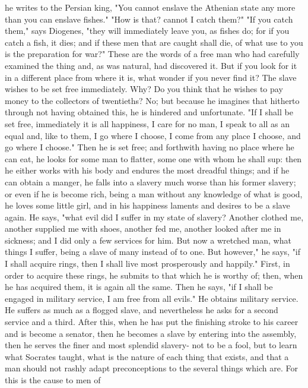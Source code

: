 \documentclass[a4paper]{article}
\begin{document}
he writes to the Persian king, "You cannot enslave the Athenian state any more
than you can enslave fishes." "How is that? cannot I catch them?" "If you catch
them," says Diogenes, "they will immediately leave you, as fishes do; for if
you catch a fish, it dies; and if these men that are caught shall die, of what
use to you is the preparation for war?" These are the words of a free man who
had carefully examined the thing and, as was natural, had discovered it. But if
you look for it in a different place from where it is, what wonder if you never
find it?
    The slave wishes to be set free immediately. Why? Do you think that he
wishes to pay money to the collectors of twentieths? No; but because he
imagines that hitherto through not having obtained this, he is hindered and
unfortunate. "If I shall be set free, immediately it is all happiness, I care
for no man, I speak to all as an equal and, like to them, I go where I choose,
I come from any place I choose, and go where I choose." Then he is set free;
and forthwith having no place where he can eat, he looks for some man to
flatter, some one with whom he shall sup: then he either works with his body
and endures the most dreadful things; and if he can obtain a manger, he falls
into a slavery much worse than his former slavery; or even if he is become
rich, being a man without any knowledge of what is good, he loves some little
girl, and in his happiness laments and desires to be a slave again. He says,
"what evil did I suffer in my state of slavery? Another clothed me, another
supplied me with shoes, another fed me, another looked after me in sickness;
and I did only a few services for him. But now a wretched man, what things I
suffer, being a slave of many instead of to one. But however," he says, "if I
shall acquire rings, then I shall live most prosperously and happily." First,
in order to acquire these rings, he submits to that which he is worthy of;
then, when he has acquired them, it is again all the same. Then he says, "if I
shall be engaged in military service, I am free from all evils." He obtains
military service. He suffers as much as a flogged slave, and nevertheless he
asks for a second service and a third. After this, when he has put the
finishing stroke to his career and is become a senator, then he becomes a slave
by entering into the assembly, then he serves the finer and most splendid
slavery- not to be a fool, but to learn what Socrates taught, what is the
nature of each thing that exists, and that a man should not rashly adapt
preconceptions to the several things which are. For this is the cause to men of
\end{document}
